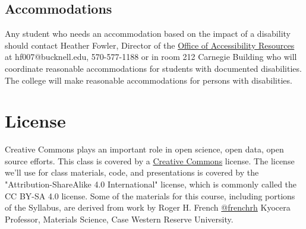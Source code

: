 \documentclass[11pt]{article} %
\begin{document}
  \subsection{Accommodations}
  
  Any student who needs an accommodation based on the impact of a disability should contact Heather Fowler, Director of the \href{https://www.bucknell.edu/life-bucknell/diversity-equity-inclusion/accessibility-resources}{Office of Accessibility Resources} at hf007@bucknell.edu, 570-577-1188 or in room 212 Carnegie Building who will coordinate reasonable accommodations for students with documented disabilities. The college will make reasonable accommodations for persons with disabilities. 


\section{License}
  
    Creative Commons plays an important role in open science, open data, open source efforts. This class is covered by a \href{"http://creativecommons.org/licenses/"}{Creative Commons} license. The license we'll use for class materials, code, and presentations is covered by the "Attribution-ShareAlike 4.0 International" license, which is commonly called the CC BY-SA 4.0 license. Some of the materials for this course, including portions of the Syllabus, are derived from work by Roger H. French \href{"https://twitter.com/frenchrh"}{@frenchrh} Kyocera Professor, Materials Science, Case Western Reserve University.


\FloatBarrier
\end{document}
